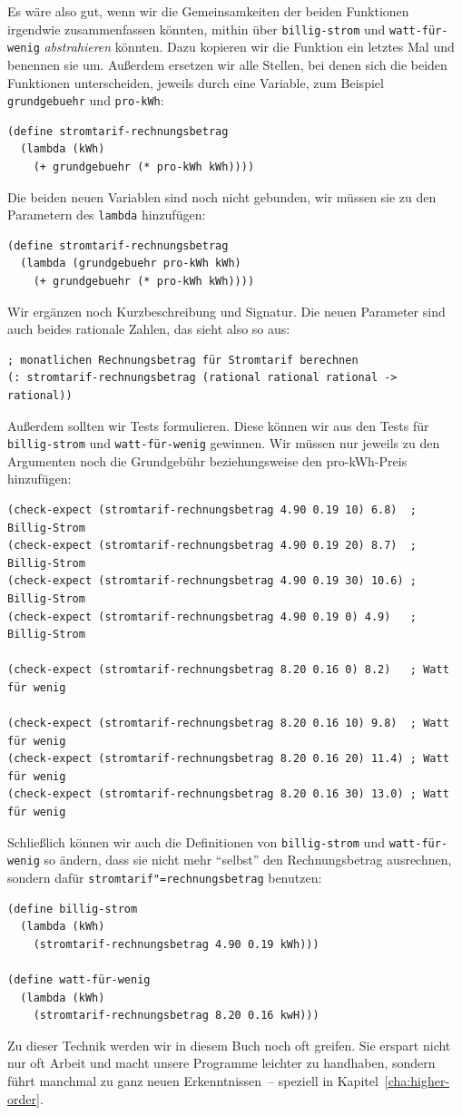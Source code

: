 Es wäre also gut, wenn wir die Gemeinsamkeiten der beiden Funktionen
irgendwie zusammenfassen könnten, mithin über \texttt{billig-strom}
und \texttt{watt-für-wenig} \textit{abstrahieren}
könnten.  Dazu kopieren wir die Funktion ein letztes Mal und benennen
sie um.  Außerdem ersetzen wir alle Stellen, bei denen sich die beiden
Funktionen unterscheiden, jeweils durch eine Variable, zum Beispiel
\texttt{grundgebuehr} und \texttt{pro-kWh}:
%
\begin{verbatim}
(define stromtarif-rechnungsbetrag
  (lambda (kWh)
    (+ grundgebuehr (* pro-kWh kWh))))
\end{verbatim}
%
Die beiden neuen Variablen sind noch nicht gebunden, wir müssen sie zu
den Parametern des \texttt{lambda} hinzufügen:
%
\begin{verbatim}
(define stromtarif-rechnungsbetrag
  (lambda (grundgebuehr pro-kWh kWh)
    (+ grundgebuehr (* pro-kWh kWh))))
\end{verbatim}
%
Wir ergänzen noch Kurzbeschreibung und Signatur.  Die neuen Parameter
sind auch beides rationale Zahlen, das sieht also so aus:
%
\begin{verbatim}
; monatlichen Rechnungsbetrag für Stromtarif berechnen
(: stromtarif-rechnungsbetrag (rational rational rational -> rational))
\end{verbatim}
%
Außerdem sollten wir Tests formulieren.  Diese können wir aus den
Tests für \texttt{billig-strom} und \texttt{watt-für-wenig} gewinnen.
Wir müssen nur jeweils zu den Argumenten noch die Grundgebühr
beziehungsweise den pro-kWh-Preis hinzufügen:
%
\begin{verbatim}
(check-expect (stromtarif-rechnungsbetrag 4.90 0.19 10) 6.8)  ; Billig-Strom
(check-expect (stromtarif-rechnungsbetrag 4.90 0.19 20) 8.7)  ; Billig-Strom
(check-expect (stromtarif-rechnungsbetrag 4.90 0.19 30) 10.6) ; Billig-Strom
(check-expect (stromtarif-rechnungsbetrag 4.90 0.19 0) 4.9)   ; Billig-Strom

(check-expect (stromtarif-rechnungsbetrag 8.20 0.16 0) 8.2)   ; Watt für wenig

(check-expect (stromtarif-rechnungsbetrag 8.20 0.16 10) 9.8)  ; Watt für wenig
(check-expect (stromtarif-rechnungsbetrag 8.20 0.16 20) 11.4) ; Watt für wenig
(check-expect (stromtarif-rechnungsbetrag 8.20 0.16 30) 13.0) ; Watt für wenig
\end{verbatim}
%
Schließlich können wir auch die Definitionen von \texttt{billig-strom}
und \texttt{watt-für-wenig} so ändern, dass sie nicht mehr "`selbst"'
den Rechnungsbetrag ausrechnen, sondern dafür
\texttt{stromtarif"=rechnungsbetrag} benutzen:
%
\begin{verbatim}
(define billig-strom
  (lambda (kWh)
    (stromtarif-rechnungsbetrag 4.90 0.19 kWh)))

(define watt-für-wenig
  (lambda (kWh)
    (stromtarif-rechnungsbetrag 8.20 0.16 kwH)))
\end{verbatim}
%
Zu dieser Technik werden wir in diesem Buch noch oft greifen.  Sie
erspart nicht nur oft Arbeit und macht unsere Programme leichter zu
handhaben, sondern führt manchmal zu ganz neuen Erkenntnissen~--
speziell in Kapitel~\ref{cha:higher-order}.

